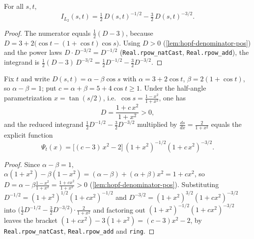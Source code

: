 \begin{lemma}
    \label{lem:hopf-integrand-reduced}
    \leanok
    For all $s,t$,
    \[
        I_{L_2}(s,t)=\tfrac12\,D(s,t)^{-1/2}-\tfrac32\,D(s,t)^{-3/2}.
    \]
\end{lemma}
\begin{proof}
    The numerator equals $\tfrac12(D-3)$, because
    $D=3+2\bigl(\cos t-(1+\cos t)\cos s\bigr)$. Using $D>0$
    (\cref{lem:hopf-denominator-pos}) and the power laws
    $D\cdot D^{-3/2}=D^{-1/2}$ (\texttt{Real.rpow\_natCast},
    \texttt{Real.rpow\_add}), the integrand is
    $\tfrac12(D-3)\,D^{-3/2}=\tfrac12 D^{-1/2}-\tfrac32 D^{-3/2}$.
\end{proof}

\begin{lemma}
    \label{lem:hopf-halfangle-reduction}
    \leanok
    Fix $t$ and write $D(s,t)=\alpha-\beta\cos s$ with $\alpha=3+2\cos t$,
    $\beta=2(1+\cos t)$, so $\alpha-\beta=1$; put $c=\alpha+\beta=5+4\cos t\ge1$.
    Under the half-angle parametrization $x=\tan(s/2)$, i.e.\
    $\cos s=\frac{1-x^2}{1+x^2}$, one has
    \[
        D=\frac{1+c\,x^2}{1+x^2}>0,
    \]
    and the reduced integrand $\tfrac12 D^{-1/2}-\tfrac32 D^{-3/2}$ multiplied by
    $\frac{ds}{dx}=\frac{2}{1+x^2}$ equals the explicit function
    \[
        \Psi_t(x)=\bigl[(c-3)\,x^2-2\bigr]\,(1+x^2)^{-1/2}(1+c\,x^2)^{-3/2}.
    \]
\end{lemma}
\begin{proof}
    Since $\alpha-\beta=1$, $\alpha(1+x^2)-\beta(1-x^2)=(\alpha-\beta)+(\alpha+\beta)x^2
    =1+cx^2$, so $D=\alpha-\beta\frac{1-x^2}{1+x^2}=\frac{1+cx^2}{1+x^2}>0$
    (\cref{lem:hopf-denominator-pos}). Substituting $D^{-1/2}=(1+x^2)^{1/2}(1+cx^2)^{-1/2}$
    and $D^{-3/2}=(1+x^2)^{3/2}(1+cx^2)^{-3/2}$ into
    $\bigl(\tfrac12 D^{-1/2}-\tfrac32 D^{-3/2}\bigr)\cdot\frac{2}{1+x^2}$ and factoring
    out $(1+x^2)^{-1/2}(1+cx^2)^{-3/2}$ leaves the bracket
    $(1+cx^2)-3(1+x^2)=(c-3)x^2-2$, by \texttt{Real.rpow\_natCast},
    \texttt{Real.rpow\_add} and \texttt{ring}.
\end{proof}

